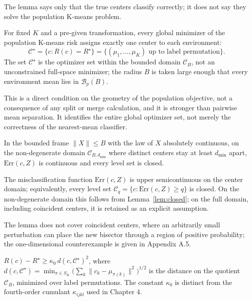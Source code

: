 The lemma says only that the true centers classify correctly; it does
not say they solve the population K-means problem.

\begin{assumption}\label{a:align}
For fixed $K$ and a pre-given transformation, every global minimizer of the population K-means risk assigns exactly one center to each environment:
$$\mathcal C^\star=\{c:R(c)=R^\star\}=\{(\mu_1,\dots,\mu_K)\text{ up to label permutation}\}.$$
The set $\mathcal C^\star$ is the optimizer set within the bounded domain $\mathcal C_B$, not an unconstrained full-space minimizer; the radius $B$ is taken large enough that every environment mean lies in $\overline{\mathcal B_p(B)}$.
\end{assumption}

This is a direct condition on the geometry of the population objective,
not a consequence of any split or merge calculation, and it is stronger
than pairwise mean separation. It identifies the entire global optimizer
set, not merely the correctness of the nearest-mean classifier.

\begin{lemma}\label{lem:closed}
In the bounded frame $\|X\|\le B$ with the law of $X$ absolutely continuous, on the non-degenerate domain $\mathcal C_{B,d_{\min}}$ where distinct centers stay at least $d_{\min}$ apart, $\mathrm{Err}(c,Z)$ is continuous and every level set is closed.
\end{lemma}

\begin{assumption}\label{a:closed}
The misclassification function $\mathrm{Err}(c,Z)$ is upper semicontinuous on the center domain; equivalently, every level set $\mathcal C_q=\{c:\mathrm{Err}(c,Z)\ge q\}$ is closed. On the non-degenerate domain this follows from Lemma~\ref{lem:closed}; on the full domain, including coincident centers, it is retained as an explicit assumption.
\end{assumption}

The lemma does not cover coincident centers, where an arbitrarily small
perturbation can place the new bisector through a region of positive
probability; the one-dimensional counterexample is given in Appendix
A.5.

\begin{assumption}\label{a:growth}
$R(c)-R^\star\ge\kappa_0\,d(c,\mathcal C^\star)^2$, where $d(c,\mathcal C^\star)=\min_{\pi\in S_K}\big(\sum_k\|c_k-\mu_{\pi(k)}\|^2\big)^{1/2}$ is the distance on the quotient $\mathcal C_B$, minimized over label permutations. The constant $\kappa_0$ is distinct from the fourth-order cumulant $\kappa_{ijkl}$ used in Chapter 4.
\end{assumption}


